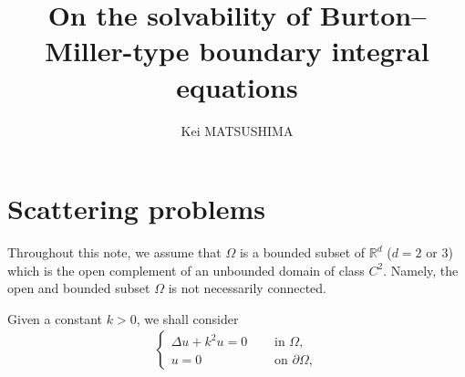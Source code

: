 \documentclass{article}
\title{On the solvability of Burton--Miller-type boundary integral equations}
\author{Kei MATSUSHIMA}
\theoremstyle{plain}
\theoremstyle{definition}
\begin{document}
\maketitle

\section{Scattering problems}
Throughout this note, we assume that $\Omega$ is a bounded subset of $\mathbb R^d$ ($d=2$ or $3$) which is the open complement of an unbounded domain of class $C^2$. Namely, the open and bounded subset $\Omega$ is not necessarily connected.

Given a constant $k>0$, we shall consider
\begin{align}\label{eq:gE}
\begin{cases}
\varDelta u + k^2 u = 0 \quad &\text{ in } \Omega,\\
u = 0
\quad &\text{ on } \partial \Omega,
\end{cases}
\end{align}
\end{document}
